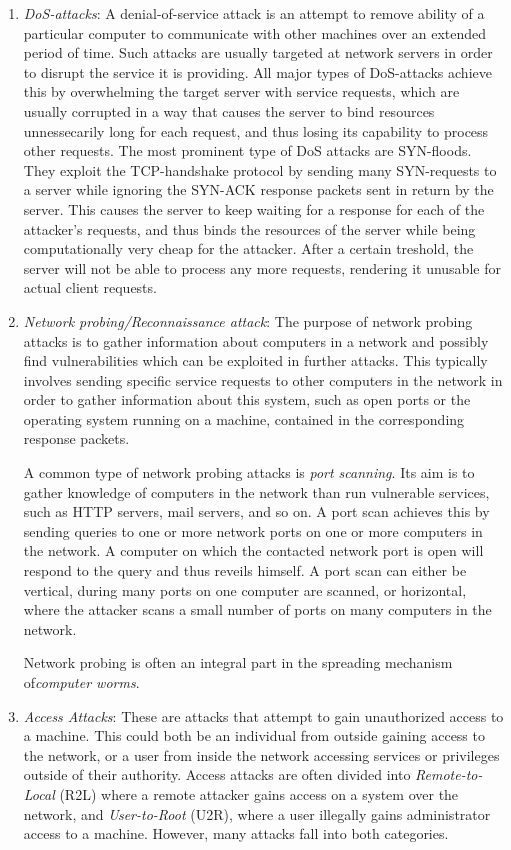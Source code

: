 \begin{enumerate}
\item \textit{DoS-attacks}: A denial-of-service attack is an attempt to remove ability of a particular computer to communicate with other machines over an extended period of time. Such attacks are usually targeted at network servers in order to disrupt the service it is providing. All major types of DoS-attacks achieve this by overwhelming the target server with service requests, which are usually corrupted in a way that causes the server to bind resources unnessecarily long for each request, and thus losing its capability to process other requests. The most prominent type of DoS attacks are SYN-floods. They exploit the TCP-handshake protocol by sending many SYN-requests to a server while ignoring the SYN-ACK response packets sent in return by the server. This causes the server to keep waiting for a response for each of the attacker's requests, and thus binds the resources of the server while being computationally very cheap for the attacker. After a certain treshold, the server will not be able to process any more requests, rendering it unusable for actual client requests.

\item \textit{Network probing/Reconnaissance attack}: The purpose of network probing attacks is to gather information about computers in a network and possibly find vulnerabilities which can be exploited in further attacks. This typically involves sending specific service requests to other computers in the network in order to gather information about this system, such as open ports or the operating system running on a machine, contained in the corresponding response packets.

A common type of network probing attacks is \textit{port scanning}. Its aim is to gather knowledge of computers in the network than run vulnerable services, such as HTTP servers, mail servers, and so on. A port scan achieves this by sending queries to one or more network ports on one or more computers in the network. A computer on which the contacted network port is open will respond to the query and thus reveils himself. A port scan can either be vertical, during many ports on one computer are scanned, or horizontal, where the attacker scans a small number of ports on many computers in the network. 

Network probing is often an integral part in the spreading mechanism of\textit{computer worms}.

\item \textit{Access Attacks}: These are attacks that attempt to gain unauthorized access to a machine. This could both be an individual from outside gaining access to the network, or a user from inside the network accessing services or privileges outside of their authority. Access attacks are often divided into \textit{Remote-to-Local} (R2L) where a remote attacker gains access on a system over the network, and \textit{User-to-Root} (U2R), where a user illegally gains administrator access to a machine. However, many attacks fall into both categories. 


\end{enumerate}
